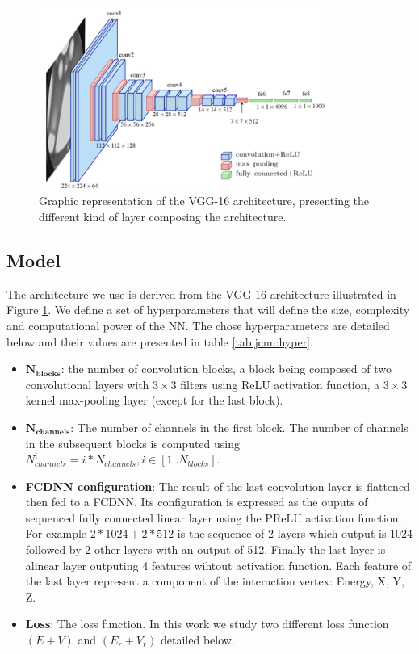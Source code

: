 \documentclass[../main.tex]{subfiles}
\begin{document}
{{\begin{figure}[ht]
  \centering
  \includegraphics[height=6cm]{images/jcnn/vgg16.png}
  \caption{Graphic representation of the VGG-16 architecture, presenting the different kind of layer composing the architecture.}
  \label{fig:jcnn:vgg16}
\end{figure}

\subsection{Model}
\label{sec:jcnn:model}

The architecture we use is derived from the VGG-16 architecture \cite{simonyan_very_2015} illustrated in Figure \ref{fig:jcnn:vgg16}. We define a set of hyperparameters that will define the size, complexity and computational power of the NN. The chose hyperparameters are detailed below and their values are presented in table \ref{tab:jcnn:hyper}.
\begin{itemize}
  \item $\mathbf{N_{blocks}}$: the number of convolution blocks, a block being composed of two convolutional layers with $3\times3$ filters using ReLU activation function, a $3\times3$ kernel max-pooling layer  (except for the last block).
  \item $\mathbf{N_{channels}}$: The number of channels in the first block. The number of channels in the subsequent blocks is computed using $N^i_{channels} = i * N_{channels}, i \in [1..N_{blocks}]$.
  \item \textbf{FCDNN configuration}: The result of the last convolution layer is flattened then fed to a FCDNN. Its configuration is expressed as the ouputs of sequenced fully connected linear layer using the PReLU activation function. For example $2 * 1024 + 2 * 512$ is the sequence of 2 layers which output is 1024 followed by 2 other layers with an output of 512. Finally the last layer is alinear layer outputing 4 features wihtout activation function. Each feature of the last layer represent a component of the interaction vertex: Energy, X, Y, Z.
  \item \textbf{Loss}: The loss function. In this work we study two different loss function $(E+V)$ and $(E_r + V_r)$ detailed below.
\end{itemize}

}}
\end{document}
